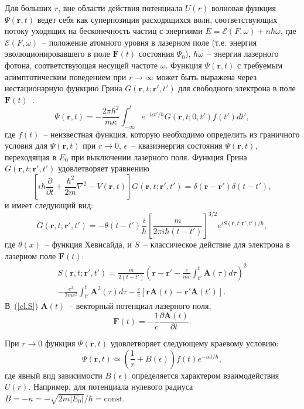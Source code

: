 \documentclass[14pt, a4paper]{article}
\numberwithin{figure}{section}
\numberwithin{equation}{section}
\newcommand{\vF}{\mathbf{F}}
\newcommand{\vA}{\mathbf{A}}
\newcommand{\vr}{\mathbf{r}}
\newcommand{\cE}{\mathcal{E}}
\begin{document}
Для больших $r$, вне области действия потенциала $U(r)$ волновая функция $\Psi(\vr,t)$ ведет себя как суперпозиция расходящихся волн, соответствующих потоку уходящих на бесконечность частиц с энергиями $E=\cE(F,\omega)+n\hbar\omega$, где $\cE(F,\omega)$~-- положение атомного уровня в лазерном поле (т.е. энергия эволюционировавшего в поле $\vF(t)$ состояния $\Psi_0$), $\hbar\omega$~-- энергия лазерного фотона,  соответствующая несущей частоте $\omega$. Функция $\Psi(\vr,t)$ с требуемым асимптотическим поведением при $r\to\infty$ может быть выражена через нестационарную функцию Грина $G(\vr,t;\vr',t')$ для свободного электрона в поле $\vF(t)$~\cite{21}:
\begin{equation}
\label{Psi:int}
\Psi(\vr,t) = -\frac{2\pi\hbar^2}{m\kappa}\int_{-\infty}^t
e^{-i\epsilon t'/\hbar} G(\vr,t;0,t')f(t')dt',
\end{equation}
где $f(t)$~-- неизвестная функция, которую необходимо определить из граничного условия для $\Psi(\vr,t)$ при $r\to 0$, $\epsilon$~-- квазиэнергия состояния $\Psi(\vr,t)$, переходящая в $E_0$ при выключении лазерного поля. Функция Грина $G(\vr,t;\vr',t')$ удовлетворяет уравнению
\begin{equation}
\label{Eq:Green}
\left[i\hbar\frac{\partial}{\partial t} + \frac{\hbar^2}{2m}\nabla^2  - V(\vr,t)\right]G(\vr,t;\vr',t') = \delta(\vr-\vr')\delta(t-t'),
\end{equation}
и имеет следующий вид:
\begin{equation}
\label{Green}
G(\vr,t;\vr',t') = -\theta(t-t')\frac{i}{\hbar}\left[\frac{m}{2\pi i\hbar(t-t')}\right]^{3/2}e^{iS(\vr,t;\vr',t')/\hbar},
\end{equation}
где $\theta(x)$~-- функция Хевисайда, и $S$~-- классическое действие для электрона в лазерном поле $\vF(t)$:
\begin{eqnarray}
S(\vr,t;\vr',t') = \frac{m}{2(t-t')}\left( \vr-\vr' -\frac{e}{mc}\int_{t'}^t\vA(\tau)d\tau \right)^2 \nonumber \\ 
-\frac{e^2}{2mc^2}\int_{t'}^t\vA^2(\tau)d\tau 
- \frac{e}{c}[\vr\vA(t)-\vr'\vA(t')].
\label{cl.S}
\end{eqnarray}
В~(\ref{cl.S}) $\vA(t)$~-- векторный потенциал лазерного поля,
\begin{equation}
\label{F-A}
\vF(t) = -\frac{1}{c}\frac{\partial\vA(t)}{\partial t}.
\end{equation}

При $r\to 0$ функция $\Psi(\vr,t)$ удовлетворяет следующему краевому условию:
\begin{equation}
\label{BC}
\Psi(\vr,t)\simeq \left(\frac{1}{r}+B(\epsilon)\right)f(t)e^{-i\epsilon t/\hbar},
\end{equation}
где явный вид зависимости $B(\epsilon)$ определяется характером взаимодействия $U(r)$. Например, для потенциала нулевого радиуса $B=-\kappa=-\sqrt{2m|E_0|}/\hbar=\mathrm{const}$.
\end{document}
